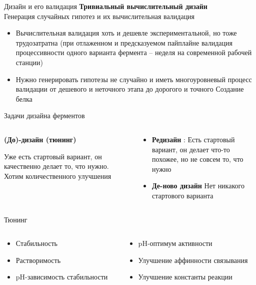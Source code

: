 \begin{frame}{Дизайн и его валидация}
\textbf{Тривиальный вычислительный дизайн}\\
Генерация случайных гипотез и их вычислительная валидация
\begin{itemize}
    \item Вычислительная валидация хоть и дешевле экспериментальной, но тоже трудозатратна (при отлаженном и предсказуемом пайплайне валидация процессивности одного варианта фермента – неделя на современной рабочей станции)
    \item Нужно генерировать гипотезы не случайно и иметь многоуровневый процесс валидации от дешевого и неточного этапа до дорогого и точного
Создание белка
\end{itemize}        
\end{frame}

\begin{frame}{Задачи дизайна ферментов}
\begin{columns}
\begin{column}{0.5\textwidth}
    \textbf{(До)-дизайн (тюнинг)}

    Уже есть стартовый вариант, он качественно делает то, что нужно.
Хотим количественного улучшения
\end{column}
\begin{column}{0.5\textwidth}
\begin{itemize}
    \item \textbf{Редизайн} : Есть стартовый вариант, 
он делает что-то похожее, 
но не совсем то, что нужно
    \item \textbf{Де-ново дизайн} Нет никакого стартового варианта
\end{itemize}
\end{column}
\end{columns}
\end{frame}


\begin{frame}{Тюнинг}
\begin{columns}
\begin{column}{0.5\textwidth}
    \begin{itemize}
        \item Стабильность
        \item Растворимость
        \item pH-зависимость стабильности
    \end{itemize}
\end{column}
\begin{column}{0.5\textwidth}
\begin{itemize}
    \item pH-оптимум активности
    \item Улучшение аффинности связывания
    \item Улучшение константы реакции
\end{itemize}
\end{column}
\end{columns}
\end{frame}

